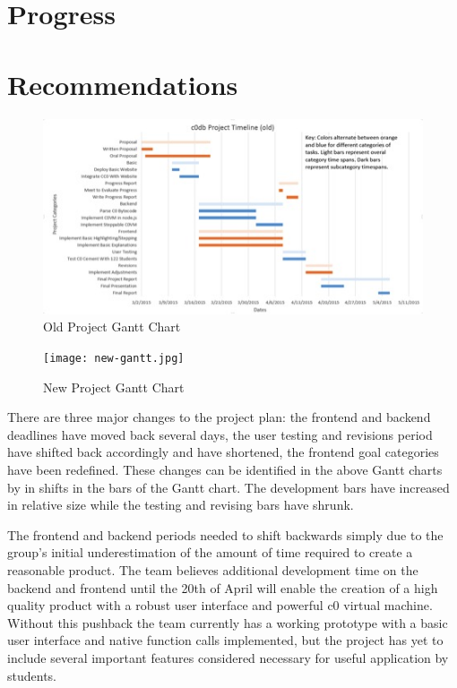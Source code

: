 \documentclass[11pt]{article}
\begin{document}
\section{Progress}
\section{Recommendations}
\begin{figure}[h]
  \centering
  \includegraphics[width=\linewidth]{old-gantt.jpg}
  \caption{Old Project Gantt Chart}
  \label{fig:old-gantt}
\end{figure}
\begin{figure}[h]
  \centering
  \texttt{[image: new-gantt.jpg]}
  \caption{New Project Gantt Chart}
  \label{fig:new-gantt}
\end{figure}
There are three major changes to the project plan: the frontend and backend
deadlines have moved back several days, the user testing and revisions period
have shifted back accordingly and have shortened, the frontend goal categories
have been redefined. These changes can be identified in the above Gantt charts
by in shifts in the bars of the Gantt chart. The development bars have
increased in relative size while the testing and revising bars have shrunk.
\par
The frontend and backend periods needed to shift backwards simply due to the
group’s initial underestimation of the amount of time required to create a
reasonable product. The team believes additional development time on the
backend and frontend until the 20th of April will enable the creation of a high
quality product with a robust user interface and powerful c0 virtual machine.
Without this pushback the team currently has a working prototype with a basic
user interface and native function calls implemented, but the project has yet
to include several important features considered necessary for useful
application by students.
\end{document}
